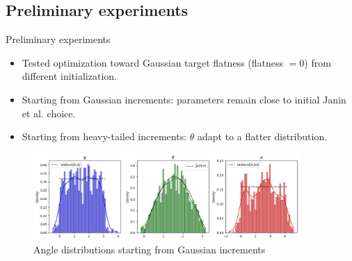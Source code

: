 \documentclass[11pt]{beamer}
\begin{document}
\subsection{Preliminary experiments}
\begin{frame}{Preliminary experiments}
  \begin{itemize}
    \item Tested optimization toward Gaussian target flatness (flatness $=0$) from different initialization.
    \item Starting from Gaussian increments: parameters remain close to initial Janin et al. choice.
    \item Starting from heavy-tailed increments: $\theta$ adapt to a flatter distribution.
  \end{itemize}
  \begin{figure}
    \centering
    \includegraphics[width=0.9\textwidth]{illustrations/StartGaussian.png}
    \caption{Angle distributions starting from Gaussian increments}
  \end{figure}
\end{frame}
\end{document}
